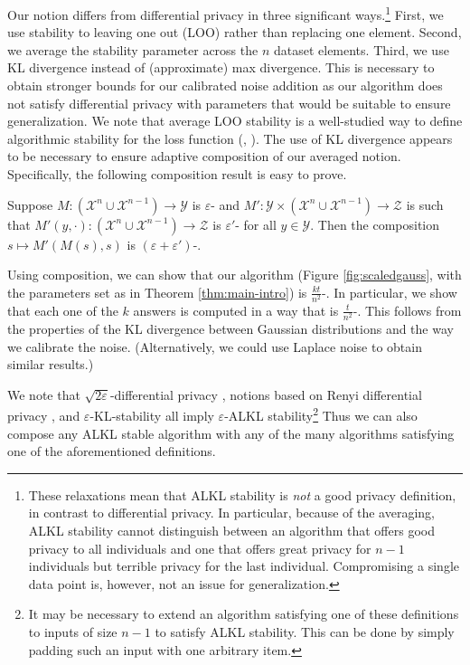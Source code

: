 \documentclass[final,12pt]{colt2018}
\providecommand\X{\mathcal{X}}
\begin{document}
Our notion differs from differential privacy in three significant ways.\footnote{These relaxations mean that ALKL stability is \emph{not} a good privacy definition, in contrast to differential privacy. In particular, because of the averaging, ALKL stability cannot distinguish between an algorithm that offers good privacy to all individuals and one that offers great privacy for $n-1$ individuals but terrible privacy for the last individual. Compromising a single data point is, however, not an issue for generalization.} First, we use stability to leaving one out (LOO) rather than replacing one element. Second, we average the stability parameter across the $n$ dataset elements. Third, we use KL divergence instead of (approximate) max divergence. This is necessary to obtain stronger bounds for our calibrated noise addition as our algorithm does not satisfy differential privacy with parameters that would be suitable to ensure generalization. We note that average LOO stability is a well-studied way to define algorithmic stability for the loss function (\eg, \citep{BousquettE02,PoggioRMN04}).
The use of KL divergence appears to be necessary to ensure adaptive composition of our averaged notion. Specifically, the following composition result is easy to prove.
\begin{lem}[Composition]\label{lem:composition-intro}
Suppose $M : \left(\X^n \cup \X^{n-1} \right) \to \mathcal{Y}$ is $\varepsilon$-\KLAS{} and $M' : \mathcal{Y} \times \left(\X^n \cup \X^{n-1} \right) \to \mathcal{Z}$ is such that $M'(y,\cdot) : \left(\X^n \cup \X^{n-1} \right) \to \mathcal{Z}$ is $\varepsilon'$-\KLAS{} for all $y \in \mathcal{Y}$. Then the composition $s \mapsto M'(M(s),s)$ is $(\varepsilon+\varepsilon')$-\KLAS{}.
\end{lem}

Using composition, we can show that our algorithm (Figure \ref{fig:scaledgauss}, with the parameters set as in Theorem \ref{thm:main-intro}) is $\frac{kt}{n^2}$-\KLAS{}. In particular, we show that each one of the $k$ answers is computed in a way that is $\frac{t}{n^2}$-\KLAS{}. This follows from the properties of the KL divergence between Gaussian distributions and the way we calibrate the noise. (Alternatively, we could use Laplace noise to obtain similar results.)

We note that $\sqrt{2\varepsilon}$-differential privacy \citep{DworkMNS:06}, notions based on Renyi differential privacy \citep{BunS16,Mironov17}, and $\varepsilon$-KL-stability \citep{BassilyNSSSU16} all imply $\varepsilon$-ALKL stability\footnote{It may be necessary to extend an algorithm satisfying one of these definitions to inputs of size $n-1$ to satisfy ALKL stability. This can be done by simply padding such an input with one arbitrary item.} Thus we can also compose any ALKL stable algorithm with any of the many algorithms satisfying one of the aforementioned definitions.
\end{document}
